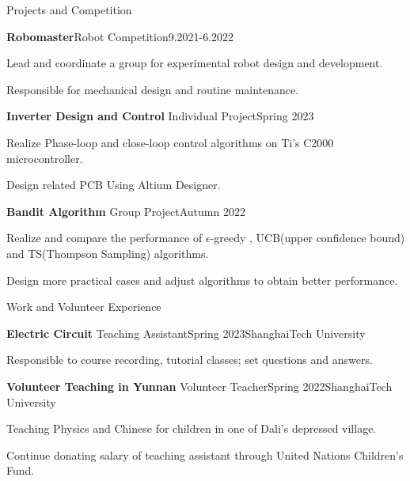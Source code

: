 \documentclass[]{ZhongtaoGuan-resume}
\begin{document}
\begin{section}{Projects and Competition}
 \begin{subsection}{\textbf{Robomaster}}{Robot Competition}{9.2021-6.2022}{}
     \item{Lead and coordinate a group for experimental robot design and development.}
     \item{Responsible for mechanical design and routine maintenance.}

 \end{subsection}
 \begin{subsection}{\textbf{Inverter Design and Control}}
     {Individual Project}{Spring 2023}{}
     \item{Realize Phase-loop and close-loop control algorithms on Ti's C2000 microcontroller.}
     \item{Design related PCB Using Altium Designer.}
 \end{subsection}
 \begin{subsection}{\textbf{Bandit Algorithm}}
     {Group Project}{Autumn 2022}{}
     \item{Realize and compare the performance of $\epsilon$-greedy , UCB(upper confidence bound) and TS(Thompson Sampling) algorithms.}
     \item{ Design more practical cases and adjust algorithms to obtain better performance.}
 \end{subsection}
\end{section}

\newpage

\begin{section}{Work and Volunteer Experience}
 \begin{subsection}{\textbf{Electric Circuit}}
     {Teaching Assistant}{Spring 2023}{ShanghaiTech University}
     \item{Responsible to course recording, tutorial classes; set questions and answers.}
 \end{subsection}
 \begin{subsection}{\textbf{Volunteer Teaching in Yunnan}}
     {Volunteer Teacher}{Spring 2022}{ShanghaiTech University}
     \item{Teaching Physics and Chinese for children in one of Dali's depressed village.}
     \item{Continue donating salary of teaching assistant through United Nations Children's Fund.}
 \end{subsection}
\end{section}
\end{document}
